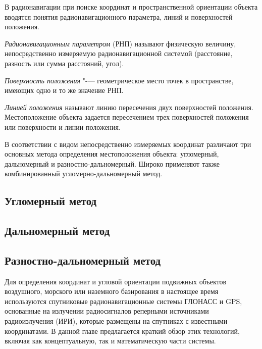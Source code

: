 \documentclass[../main.tex]{subfiles}
\begin{document}

В радионавигации при поиске координат и пространственной ориентации объекта вводятся понятия радионавигационного параметра, линий и поверхностей положения.

\textit{Радионавигационным параметром} (РНП) называют физическую величину, непосредственно измеряемую радионавигационной системой (расстояние, разность или сумма расстояний, угол).

\textit{Поверхность положения} "-— геометрическое место точек в пространстве, имеющих одно и то же значение РНП.

\textit{Линией положения} называют линию пересечения двух поверхностей положения. Местоположение объекта задается пересечением трех поверхностей положения или поверхности и линии положения.

В соответствии с видом непосредственно измеряемых координат различают три основных метода определения местоположения объекта: угломерный, дальномерный и разностно-дальномерный. Широко применяют также комбинированный угломерно-дальномерный метод.

\subsection{Угломерный метод}

\subsection{Дальномерный метод}

\subsection{Разностно-дальномерный метод}

Для определения координат и угловой ориентации подвижных объектов воздушного, морского или наземного базирования в настоящее время используются спутниковые радионавигационные системы ГЛОНАСС и GPS, основанные на излучении радиосигналов реперными источниками радиоизлучения (ИРИ), которые размещены на спутниках с известными координатами. В данной главе предлагается краткий обзор этих технологий, включая как концептуальную, так и математическую части системы.
\end{document}
